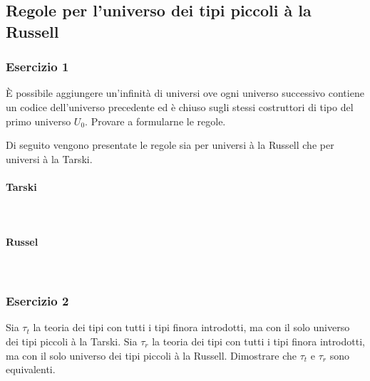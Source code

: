 \subsection{Regole per l’universo dei tipi piccoli à la Russell}
\subsubsection{Esercizio 1}
\begin{thm} 
	\`E possibile aggiungere un'infinità di universi ove ogni universo successivo contiene un codice dell'universo precedente ed è chiuso sugli stessi costruttori di tipo del primo universo $U_0$. Provare a formularne le regole.
\end{thm}
Di seguito vengono presentate le regole sia per universi à la Russell che per universi à la Tarski.

\paragraph{Tarski} \mbox{} \\


\paragraph{Russel} \mbox{} \\


\subsubsection{Esercizio 2}
\begin{thm}
	Sia $\tau_t$ la teoria dei tipi con tutti i tipi finora introdotti, ma con il solo universo dei tipi piccoli à la Tarski. Sia $\tau_r$ la teoria dei tipi con tutti i tipi finora introdotti, ma con il solo universo dei tipi piccoli à la Russell. Dimostrare che $\tau_t$ e $\tau_r$ sono equivalenti.
\end{thm}
